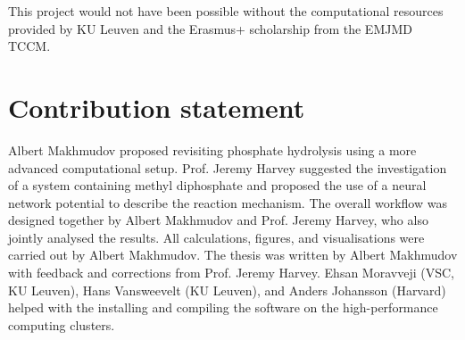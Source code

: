 \par\smallskip
This project would not have been possible without the computational resources provided by KU Leuven and the Erasmus+ scholarship from the EMJMD TCCM.


\chapter*{Contribution statement}
Albert Makhmudov proposed revisiting phosphate hydrolysis using a more advanced computational setup. Prof. Jeremy Harvey suggested the investigation of a system containing methyl diphosphate and proposed the use of a neural network potential to describe the reaction mechanism. The overall workflow was designed together by Albert Makhmudov and Prof. Jeremy Harvey, who also jointly analysed the results. All calculations, figures, and visualisations were carried out by Albert Makhmudov. The thesis was written by Albert Makhmudov with feedback and corrections from Prof. Jeremy Harvey. Ehsan Moravveji (VSC, KU Leuven), Hans Vansweevelt (KU Leuven), and Anders Johansson (Harvard) helped with the installing and compiling the software on the high-performance computing clusters.